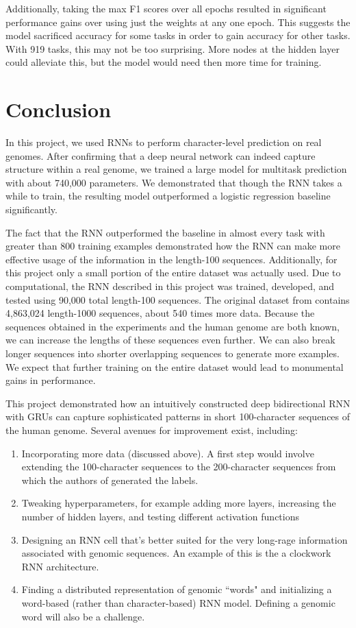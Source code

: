 \documentclass{article} %
\begin{document}
Additionally, taking the max F1 scores over all epochs resulted in significant performance gains over using just the weights at any one epoch. This suggests the model sacrificed accuracy for some tasks in order to gain accuracy for other tasks. With 919 tasks, this may not be too surprising. More nodes at the hidden layer could alleviate this, but the model would need then more time for training.

\section{Conclusion}
In this project, we used RNNs to perform character-level prediction on real genomes. After confirming that a deep neural network can indeed capture structure within a real genome, we trained a large model for multitask prediction with about 740,000 parameters. We demonstrated that though the RNN takes a while to train, the resulting model outperformed a logistic regression baseline significantly.

The fact that the RNN outperformed the baseline in almost every task with greater than 800 training examples demonstrated how the RNN can make more effective usage of the information in the length-100 sequences. Additionally, for this project only a small portion of the entire dataset was actually used. Due to computational, the RNN described in this project was trained, developed, and tested using 90,000 total length-100 sequences. The original dataset from \cite{zhou2015predicting} contains 4,863,024 length-1000 sequences, about 540 times more data. Because the sequences obtained in the experiments and the human genome are both known, we can increase the lengths of these sequences even further. We can also break longer sequences into shorter overlapping sequences to generate more examples. We expect that further training on the entire dataset would lead to monumental gains in performance. 

This project demonstrated how an intuitively constructed deep bidirectional RNN with GRUs can capture sophisticated patterns in short 100-character sequences of the human genome. Several avenues for improvement exist, including:
\begin{enumerate}
	\item Incorporating more data (discussed above). A first step would involve extending the 100-character sequences to the 200-character sequences from which the authors of \cite{zhou2015predicting} generated the labels. 
	\item Tweaking hyperparameters, for example adding more layers, increasing the number of hidden layers, and testing different activation functions
	\item Designing an RNN cell that's better suited for the very long-rage information associated with genomic sequences. An example of this is the a clockwork RNN \cite{koutnik2014clockwork} architecture.
	\item Finding a distributed representation of genomic ``words" and initializing a word-based (rather than character-based) RNN model. Defining a genomic word will also be a challenge.
\end{enumerate}
\end{document}
